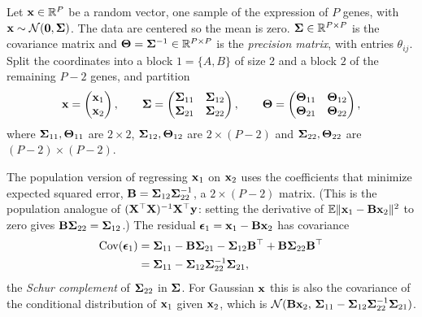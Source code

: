 Let $\mathbf{x}\in\mathbb{R}^P$ be a random vector, one sample of the expression of $P$ genes, with $\mathbf{x}\sim\mathcal{N}(\mathbf{0},\boldsymbol{\Sigma})$. The data are centered so the mean is zero. $\boldsymbol{\Sigma}\in\mathbb{R}^{P\times P}$ is the covariance matrix and $\boldsymbol{\Theta}=\boldsymbol{\Sigma}^{-1}\in\mathbb{R}^{P\times P}$ is the \emph{precision matrix}, with entries $\theta_{ij}$. Split the coordinates into a block $1=\{A,B\}$ of size 2 and a block $2$ of the remaining $P-2$ genes, and partition
\begin{equation}
  \mathbf{x} = \begin{pmatrix}\mathbf{x}_1\\ \mathbf{x}_2\end{pmatrix},\qquad
  \boldsymbol{\Sigma} = \begin{pmatrix}\boldsymbol{\Sigma}_{11} & \boldsymbol{\Sigma}_{12}\\ \boldsymbol{\Sigma}_{21} & \boldsymbol{\Sigma}_{22}\end{pmatrix},\qquad
  \boldsymbol{\Theta} = \begin{pmatrix}\boldsymbol{\Theta}_{11} & \boldsymbol{\Theta}_{12}\\ \boldsymbol{\Theta}_{21} & \boldsymbol{\Theta}_{22}\end{pmatrix},
\end{equation}
where $\boldsymbol{\Sigma}_{11},\boldsymbol{\Theta}_{11}$ are $2\times 2$, $\boldsymbol{\Sigma}_{12},\boldsymbol{\Theta}_{12}$ are $2\times(P-2)$ and $\boldsymbol{\Sigma}_{22},\boldsymbol{\Theta}_{22}$ are $(P-2)\times(P-2)$.

The population version of regressing $\mathbf{x}_1$ on $\mathbf{x}_2$ uses the coefficients that minimize expected squared error, $\mathbf{B}=\boldsymbol{\Sigma}_{12}\boldsymbol{\Sigma}_{22}^{-1}$, a $2\times(P-2)$ matrix. (This is the population analogue of $(\mathbf{X}^\top\mathbf{X})^{-1}\mathbf{X}^\top\mathbf{y}$: setting the derivative of $\mathbb{E}\|\mathbf{x}_1-\mathbf{B}\mathbf{x}_2\|^2$ to zero gives $\mathbf{B}\boldsymbol{\Sigma}_{22}=\boldsymbol{\Sigma}_{12}$.) The residual $\boldsymbol{\epsilon}_1=\mathbf{x}_1-\mathbf{B}\mathbf{x}_2$ has covariance
\begin{align}
  \operatorname{Cov}(\boldsymbol{\epsilon}_1) &= \boldsymbol{\Sigma}_{11} - \mathbf{B}\boldsymbol{\Sigma}_{21} - \boldsymbol{\Sigma}_{12}\mathbf{B}^\top + \mathbf{B}\boldsymbol{\Sigma}_{22}\mathbf{B}^\top \nonumber\\
  &= \boldsymbol{\Sigma}_{11} - \boldsymbol{\Sigma}_{12}\boldsymbol{\Sigma}_{22}^{-1}\boldsymbol{\Sigma}_{21},
\end{align}
the \emph{Schur complement} of $\boldsymbol{\Sigma}_{22}$ in $\boldsymbol{\Sigma}$. For Gaussian $\mathbf{x}$ this is also the covariance of the conditional distribution of $\mathbf{x}_1$ given $\mathbf{x}_2$, which is $\mathcal{N}(\mathbf{B}\mathbf{x}_2,\,\boldsymbol{\Sigma}_{11}-\boldsymbol{\Sigma}_{12}\boldsymbol{\Sigma}_{22}^{-1}\boldsymbol{\Sigma}_{21})$.

